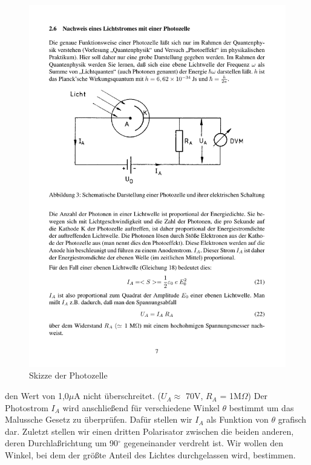 \documentclass[12pt]{scrartcl}
\begin{document}
\begin{figure}[H] 
  \centering
    \includegraphics[trim = 0mm 112mm 0mm 50mm, clip, scale = 1]{abb_3.pdf}
  	\caption[Skizze der Photozelle]{Skizze der Photozelle\footnotemark}
  \label{fig:abb_3}
\end{figure}

den Wert von 1,0$\mu$A nicht überschreitet. ($U_A \approx$ 70V, $R_A$ = 1M$\Omega$) Der Photostrom $I_A$ wird anschließend für verschiedene Winkel $\theta$ bestimmt um das Malussche Gesetz zu überprüfen.
Dafür stellen wir $I_A$ als Funktion von $\theta$ grafisch dar.
Zuletzt stellen wir einen dritten Polarisator zwischen die beiden anderen, deren Durchlaßrichtung
um 90$^\circ$ gegeneinander verdreht ist. Wir wollen den Winkel, bei dem der größte Anteil des Lichtes durchgelassen wird, bestimmen.
\end{document}
